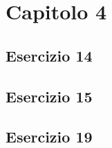 \section{\textbf{Capitolo 4}}
\subsection{Esercizio 14}

\subsection{Esercizio 15}

\subsection{Esercizio 19}

